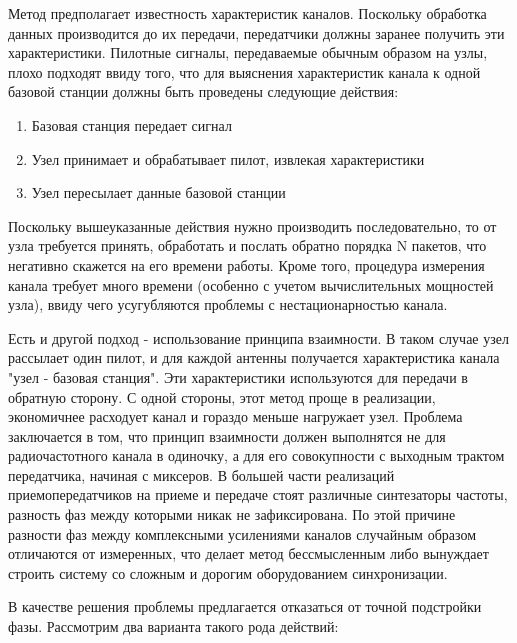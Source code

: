 \documentclass[a4paper,12pt,oneside, abstract=true]{scrartcl}
\begin{document}
Метод предполагает известность характеристик каналов. 
Поскольку обработка данных производится до их передачи, передатчики должны заранее получить эти характеристики. 
Пилотные сигналы, передаваемые обычным образом на узлы, плохо подходят ввиду того, что для выяснения характеристик канала к одной базовой станции должны быть проведены следующие действия:
\begin{enumerate}
\item Базовая станция передает сигнал
\item Узел принимает и обрабатывает пилот, извлекая характеристики
\item Узел пересылает данные базовой станции
\end{enumerate}
Поскольку вышеуказанные действия нужно производить последовательно, то от узла требуется принять, обработать и послать обратно порядка N пакетов, что негативно скажется на его времени работы. 
Кроме того, процедура измерения канала требует много времени (особенно с учетом вычислительных мощностей узла), ввиду чего усугубляются проблемы с нестационарностью канала.

Есть и другой подход - использование принципа взаимности. 
В таком случае узел рассылает один пилот, и для каждой антенны получается характеристика канала "узел - базовая станция". 
Эти характеристики используются для передачи в обратную сторону. 
С одной стороны, этот метод проще в реализации, экономичнее расходует канал и гораздо меньше нагружает узел. 
Проблема заключается в том, что принцип взаимности должен выполнятся не для радиочастотного канала в одиночку, а для его совокупности с выходным трактом передатчика, начиная с миксеров. 
В большей части реализаций приемопередатчиков на приеме и передаче стоят различные синтезаторы частоты, разность фаз между которыми никак не зафиксирована. 
По этой причине разности фаз между комплексными усилениями каналов случайным образом отличаются от измеренных, что делает метод бессмысленным либо вынуждает строить систему со сложным и дорогим оборудованием синхронизации.

В качестве решения проблемы предлагается отказаться от точной подстройки фазы. Рассмотрим два варианта такого рода действий:
\end{document}

